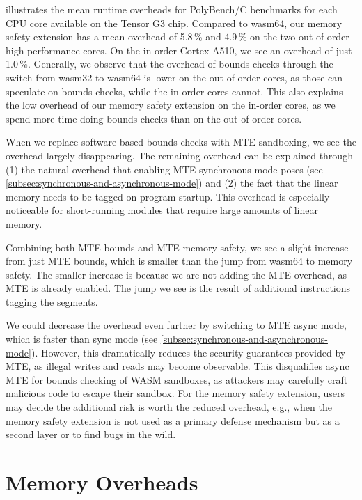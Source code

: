  illustrates the mean runtime overheads for PolyBench/C benchmarks for each CPU core available on the Tensor G3 chip.
Compared to wasm64, our memory safety extension has a mean overhead of 5.8\,\% and 4.9\,\% on the two out-of-order high-performance cores.
On the in-order Cortex-A510, we see an overhead of just 1.0\,\%.
Generally, we observe that the overhead of bounds checks through the switch from wasm32 to wasm64 is lower on the out-of-order cores, as those can speculate on bounds checks, while the in-order cores cannot.
This also explains the low overhead of our memory safety extension on the in-order cores, as we spend more time doing bounds checks than on the out-of-order cores.

When we replace software-based bounds checks with \ac{MTE} sandboxing, we see the overhead largely disappearing.
The remaining overhead can be explained through (1) the natural overhead that enabling \ac{MTE} synchronous mode poses (see \cref{subsec:synchronous-and-asynchronous-mode}) and (2) the fact that the linear memory needs to be tagged on program startup.
This overhead is especially noticeable for short-running modules that require large amounts of linear memory.

Combining both \ac{MTE} bounds and \ac{MTE} memory safety, we see a slight increase from just \ac{MTE} bounds, which is smaller than the jump from wasm64 to memory safety.
The smaller increase is because we are not adding the \ac{MTE} overhead, as \ac{MTE} is already enabled.
The jump we see is the result of additional instructions tagging the segments.

We could decrease the overhead even further by switching to \ac{MTE} async mode, which is faster than sync mode (see \cref{subsec:synchronous-and-asynchronous-mode}).
However, this dramatically reduces the security guarantees provided by \ac{MTE}, as illegal writes and reads may become observable.
This disqualifies async \ac{MTE} for bounds checking of \ac{WASM} sandboxes, as attackers may carefully craft malicious code to escape their sandbox.
For the memory safety extension, users may decide the additional risk is worth the reduced overhead, e.g., when the memory safety extension is not used as a primary defense mechanism but as a second layer or to find bugs in the wild.


\section{Memory Overheads}\label{sec:memory-overheads}

